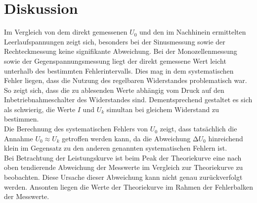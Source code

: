 \section{Diskussion}
\label{sec:Diskussion}
Im Vergleich von dem direkt gemessenen $U_0$ und den im Nachhinein ermittelten Leerlaufspannungen zeigt sich, besonders bei der Sinusmessung sowie der Rechteckmessung keine signifikante Abweichung.
Bei der Monozellenmessung sowie der Gegenspannungsmessung liegt der direkt gemessene Wert leicht unterhalb des bestimmten Fehlerintervalls.
Dies mag in dem systematischen Fehler liegen, dass die Nutzung des regelbaren Widerstandes problematisch war.
So zeigt sich, dass die zu ablesenden Werte abhängig vom Druck auf den Inbetriebnahmeschalter des Widerstandes sind.
Dementsprechend gestaltet es sich als schwierig, die Werte $I$ und $U_k$ simultan bei gleichem Widerstand zu bestimmen. \\
Die Berechnung des systematischen Fehlers von $U_0$ zeigt, dass tatsächlich die Annahme $U_0 \approx U_k$ getroffen werden kann, da die Abweichung $\increment{U_0}$ hinreichend klein im Gegensatz zu den anderen genannten systematischen Fehlern ist.\\
Bei Betrachtung der Leistungskurve ist beim Peak der Theoriekurve eine nach oben tendierende Abweichung der Messwerte im Vergleich zur Theoriekurve zu beobachten.
Diese Ursache dieser Abweichung kann nicht genau zurückverfolgt werden.
Ansonten liegen die Werte der Theoriekurve im Rahmen der Fehlerbalken der Messwerte.
